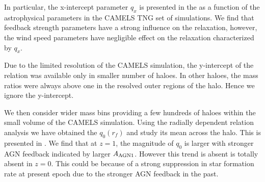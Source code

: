 In particular, the x-intercept parameter $q_x$ is presented in the  as a function of the astrophysical parameters in the CAMELS TNG set of simulations. We find that feedback strength parameters have a strong influence on the relaxation, however, the wind speed parameters have negligible effect on the relaxation characterized by $q_x$.

Due to the limited resolution of the CAMELS simulation, the y-intercept of the relation was available only in smaller number of haloes. In other haloes, the mass ratios were always above one in the resolved outer regions of the halo. Hence we ignore the y-intercept.

 
 We then consider wider mass bins providing a few hundreds of haloes within the small volume of the CAMELS simulation. Using the radially dependent relation analysis we have obtained the $q_0(r_f)$ and study its mean across the halo. This is presented in . We find that at $z=1$, the magnitude of $q_0$ is larger with stronger AGN feedback indicated by larger $A_{\rm{AGN1}}$. However this trend is absent is totally absent in $z=0$. This could be because of a strong suppression in star formation rate at present epoch due to the stronger AGN feedback in the past.
